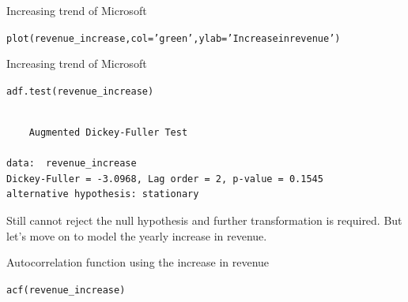 \documentclass{beamer}\usepackage[]{graphicx}\usepackage[]{color}
\makeatletter
\newcommand{\hlstr}[1]{\textcolor[rgb]{1,0.894,0.71}{#1}}%
\newcommand{\hlstd}[1]{\textcolor[rgb]{1,0.894,0.769}{#1}}%
\newcommand{\hlkwc}[1]{\textcolor[rgb]{0.78,0.941,0.545}{#1}}%
\newcommand{\hlkwd}[1]{\textcolor[rgb]{1,0.78,0.769}{#1}}%
\newenvironment{kframe}{%
 \def\at@end@of@kframe{}%
 \ifinner\ifhmode%
  \def\at@end@of@kframe{\end{minipage}}%
  \begin{minipage}{\columnwidth}%
 \fi\fi%
 \def\FrameCommand##1{\hskip\@totalleftmargin \hskip-\fboxsep
 \colorbox{shadecolor}{##1}\hskip-\fboxsep
     \hskip-\linewidth \hskip-\@totalleftmargin \hskip\columnwidth}%
 \MakeFramed {\advance\hsize-\width
   \@totalleftmargin\z@ \linewidth\hsize
   \@setminipage}}%
 {\par\unskip\endMakeFramed%
 \at@end@of@kframe}
\newenvironment{knitrout}{}{} %
\makeatother
\begin{document}
\begin{darkframes}
    \begin{frame}[fragile]{Increasing trend of Microsoft}
      \fontsize{9}{9}\selectfont
\begin{knitrout}
\begin{kframe}
\begin{alltt}
\hlkwd{plot}\hlstd{(revenue_increase,} \hlkwc{col}\hlstd{=}\hlstr{'green'}\hlstd{,} \hlkwc{ylab}\hlstd{=}\hlstr{'Increase in revenue'}\hlstd{)}
\end{alltt}
\end{kframe}


\end{knitrout}
    \end{frame}
    
    
    
    
    \begin{frame}[fragile]{Increasing trend of Microsoft}
\begin{knitrout}
\begin{kframe}
\begin{alltt}
\hlkwd{adf.test}\hlstd{(revenue_increase)}
\end{alltt}
\begin{verbatim}

	Augmented Dickey-Fuller Test

data:  revenue_increase
Dickey-Fuller = -3.0968, Lag order = 2, p-value = 0.1545
alternative hypothesis: stationary
\end{verbatim}
\end{kframe}
\end{knitrout}
      \pause
      
      Still cannot reject the null hypothesis and further transformation is required. But let's move on to model the yearly increase in revenue.
    \end{frame}
    
      
    
    
    \begin{frame}[fragile]{Autocorrelation function using the increase in revenue}  
\begin{knitrout}
\begin{kframe}
\begin{alltt}
\hlkwd{acf}\hlstd{(revenue_increase)}
\end{alltt}
\end{kframe}



\end{knitrout}
\end{frame}
\end{darkframes}
\end{document}
